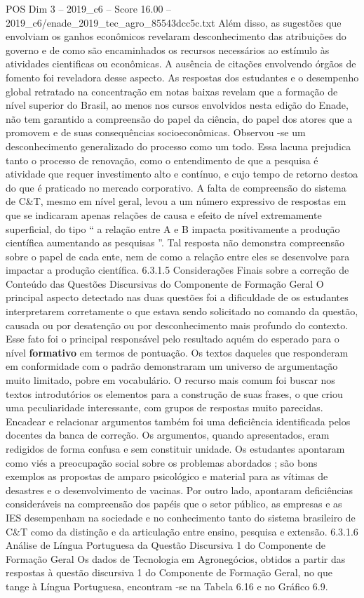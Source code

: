 \begin{textsample}{POS Dim 3 – 2019\_c6 – Score 16.00 – 2019\_c6/enade\_2019\_tec\_agro\_85543dcc5c.txt}
Além disso, as sugestões que envolviam os ganhos econômicos revelaram desconhecimento das atribuições do governo e de como são encaminhados os recursos necessários ao estímulo às atividades cientificas ou econômicas.
A ausência de citações envolvendo órgãos de fomento foi reveladora desse aspecto.
As respostas dos estudantes e o desempenho global retratado na concentração em notas baixas revelam que a formação de nível superior do Brasil, ao menos nos cursos envolvidos nesta edição do Enade, não tem garantido a compreensão do papel da ciência, do papel dos atores que a promovem e de suas consequências socioeconômicas.
Observou -se um desconhecimento generalizado do processo como um todo.
Essa lacuna prejudica tanto o processo de renovação, como o entendimento de que a pesquisa é atividade que requer investimento alto e contínuo, e cujo tempo de retorno destoa do que é praticado no mercado corporativo.
A falta de compreensão do sistema de C\&T, mesmo em nível geral, levou a um número expressivo de respostas em que se indicaram apenas relações de causa e efeito de nível extremamente superficial, do tipo “ a relação entre A e B impacta positivamente a produção científica aumentando as pesquisas ”.
Tal resposta não demonstra compreensão sobre o papel de cada ente, nem de como a relação entre eles se desenvolve para impactar a produção científica. 6.3.1.5 Considerações Finais sobre a correção de Conteúdo das Questões Discursivas do Componente de Formação Geral O principal aspecto detectado nas duas questões foi a dificuldade de os estudantes interpretarem corretamente o que estava sendo solicitado no comando da questão, causada ou por desatenção ou por desconhecimento mais profundo do contexto.
Esse fato foi o principal responsável pelo resultado aquém do esperado para o nível \textbf{formativo} em termos de pontuação.
Os textos daqueles que responderam em conformidade com o padrão demonstraram um universo de argumentação muito limitado, pobre em vocabulário.
O recurso mais comum foi buscar nos textos introdutórios os elementos para a construção de suas frases, o que criou uma peculiaridade interessante, com grupos de respostas muito parecidas.
Encadear e relacionar argumentos também foi uma deficiência identificada pelos docentes da banca de correção.
Os argumentos, quando apresentados, eram redigidos de forma confusa e sem constituir unidade.
Os estudantes apontaram como viés a preocupação social sobre os problemas abordados ; são bons exemplos as propostas de amparo psicológico e material para as vítimas de desastres e o desenvolvimento de vacinas.
Por outro lado, apontaram deficiências consideráveis na compreensão dos papéis que o setor público, as empresas e as IES desempenham na sociedade e no conhecimento tanto do sistema brasileiro de C\&T como da distinção e da articulação entre ensino, pesquisa e extensão. 6.3.1.6 Análise de Língua Portuguesa da Questão Discursiva 1 do Componente de Formação Geral Os dados de Tecnologia em Agronegócios, obtidos a partir das respostas à questão discursiva 1 do Componente de Formação Geral, no que tange à Língua Portuguesa, encontram -se na Tabela 6.16 e no Gráfico 6.9.

\end{textsample}
